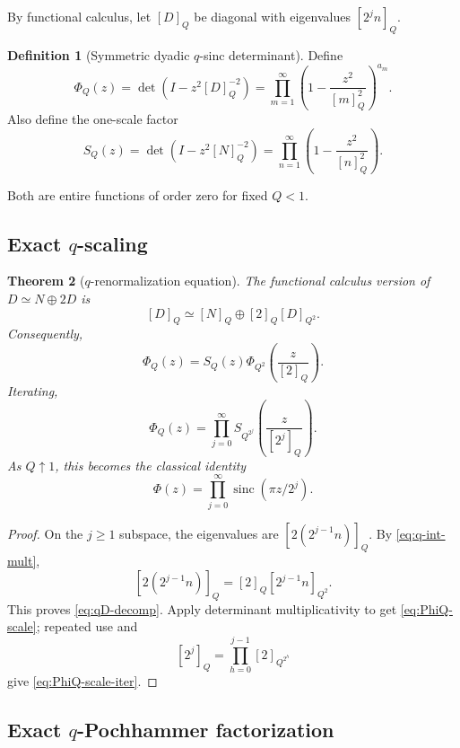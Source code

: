 \documentclass[11pt,oneside]{article}
\numberwithin{equation}{section}
\theoremstyle{plain}
\newtheorem{theorem}{Theorem}[section]
\theoremstyle{definition}
\newtheorem{definition}[theorem]{Definition}
\theoremstyle{remark}
\newcommand{\sinc}{\operatorname{sinc}}
\begin{document}
By functional calculus, let $[D]_Q$ be diagonal with eigenvalues $[2^jn]_Q$.

\begin{definition}[Symmetric dyadic $q$-sinc determinant]\label{def:PhiQ}
Define
\begin{equation}\label{eq:PhiQ}
 \boxed{\ \Phi_Q(z)=\det(I-z^2[D]_Q^{-2})
 =\prod_{m=1}^{\infty}
 \left(1-\frac{z^2}{[m]_Q^2}\right)^{a_m}.\ }
\end{equation}
Also define the one-scale factor
\begin{equation}\label{eq:SQ}
 S_Q(z)=\det(I-z^2[N]_Q^{-2})
 =\prod_{n=1}^{\infty}\left(1-\frac{z^2}{[n]_Q^2}\right).
\end{equation}
\end{definition}
Both are entire functions of order zero for fixed $Q<1$.

\subsection{Exact $q$-scaling}

\begin{theorem}[$q$-renormalization equation]\label{thm:q-scaling}
The functional calculus version of $D\simeq N\oplus2D$ is
\begin{equation}\label{eq:qD-decomp}
 [D]_Q\simeq[N]_Q\oplus[2]_Q[D]_{Q^2}.
\end{equation}
Consequently,
\begin{equation}\label{eq:PhiQ-scale}
 \boxed{\ \Phi_Q(z)=S_Q(z)
 \Phi_{Q^2}\!\left(\frac{z}{[2]_Q}\right).\ }
\end{equation}
Iterating,
\begin{equation}\label{eq:PhiQ-scale-iter}
 \boxed{\ \Phi_Q(z)=\prod_{j=0}^{\infty}
 S_{Q^{2^j}}\!\left(\frac{z}{[2^j]_Q}\right).\ }
\end{equation}
As $Q\uparrow1$, this becomes the classical identity
\[
 \Phi(z)=\prod_{j=0}^{\infty}\sinc(\pi z/2^j).
\]
\end{theorem}

\begin{proof}
On the $j\ge1$ subspace, the eigenvalues are $[2(2^{j-1}n)]_Q$.  By \cref{eq:q-int-mult},
\[
 [2(2^{j-1}n)]_Q=[2]_Q[2^{j-1}n]_{Q^2}.
\]
This proves \cref{eq:qD-decomp}.  Apply determinant multiplicativity to get \cref{eq:PhiQ-scale}; repeated use and
\[
 [2^j]_Q=\prod_{h=0}^{j-1}[2]_{Q^{2^h}}
\]
give \cref{eq:PhiQ-scale-iter}.
\end{proof}

\subsection{Exact $q$-Pochhammer factorization}
\end{document}
